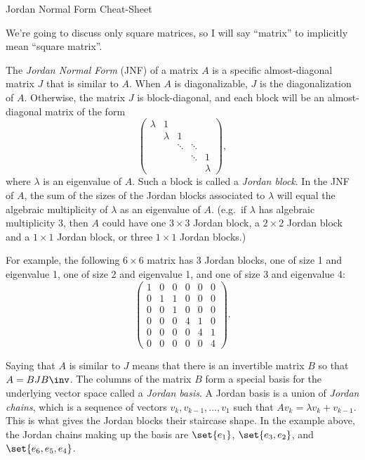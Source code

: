 \begin{center}
    \huge Jordan Normal Form Cheat-Sheet
\end{center}

\vspace{5mm}
\noindent We're going to discuss only square matrices, so I will say ``matrix'' to implicitly mean ``square matrix''.

\vspace{1em}
The \emph{Jordan Normal Form} (JNF) of a matrix $A$ is a specific almost-diagonal matrix $J$ that is similar to $A$. When $A$ is diagonalizable, $J$ is the diagonalization of $A$. Otherwise, the matrix $J$ is block-diagonal, and each block will be an almost-diagonal matrix of the form
\[\begin{pmatrix}
    \lambda & 1 & & & \\
     & \lambda & 1 & & \\
     & & \ddots & \ddots & \\
     & & & \ddots & 1\\
     & & &  & \lambda 
\end{pmatrix},\]
where $\lambda$ is an eigenvalue of $A$. Such a block is called a \emph{Jordan block}. In the JNF of $A$, the sum of the sizes of the Jordan blocks associated to $\lambda$ will equal the algebraic multiplicity of $\lambda$ as an eigenvalue of $A$. (e.g.\ if $\lambda$ has algebraic multiplicity 3, then $A$ could have one $3 \times 3$ Jordan block, a $2 \times 2$ Jordan block and a $1 \times 1$ Jordan block, or three $1 \times 1$ Jordan blocks.)

For example, the following $6 \times 6$ matrix has 3 Jordan blocks, one of size 1 and eigenvalue 1, one of size 2 and eigenvalue 1, and one of size 3 and eigenvalue 4:
\[\begin{pmatrix}
    1 & 0 & 0 & 0 & 0 & 0\\
    0 & 1 & 1 & 0 & 0 & 0\\
    0 & 0 & 1 & 0 & 0 & 0\\
    0 & 0 & 0 & 4 & 1 & 0\\
    0 & 0 & 0 & 0 & 4 & 1\\
    0 & 0 & 0 & 0 & 0 & 4
\end{pmatrix}.\]

Saying that $A$ is similar to $J$ means that there is an invertible matrix $B$ so that $A = BJB\inv$. The columns of the matrix $B$ form a special basis for the underlying vector space called a \emph{Jordan basis}. A Jordan basis is a union of \emph{Jordan chains}, which is a sequence of vectors $v_k,v_{k-1},\dots,v_1$ such that $Av_k = \lambda v_k + v_{k-1}$. This is what gives the Jordan blocks their staircase shape. In the example above, the Jordan chains making up the basis are $\set{e_1}$, $\set{e_3,e_2}$, and $\set{e_6,e_5,e_4}$.


